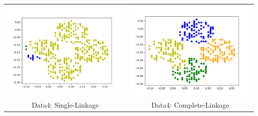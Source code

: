 \documentclass{article}
\begin{document}
\begin{tabular}{c|c}
\includegraphics[scale=0.4]{hac_images/data4single.png}&\includegraphics[scale=0.4]{hac_images/data4complete.png}\\
{Data4: Single-Linkage}&{Data4: Complete-Linkage}\\

\end{tabular}
\end{document}
